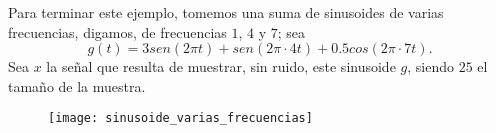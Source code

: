 \begin{ejemplo}
Para terminar este ejemplo, tomemos una suma de sinusoides
de varias frecuencias, digamos, de frecuencias
$1$, $4$ y $7$; sea
\[
g(t) = 3 sen(2 \pi t) + sen(2 \pi \cdot 4t) + 0.5 cos(2 \pi \cdot 7t).
\]
Sea $x$ la señal que resulta de muestrar, sin ruido, este sinusoide
$g$, siendo $25$ el tamaño de la muestra.
\begin{figure}[H]
	\centering
	\texttt{[image: sinusoide\_varias\_frecuencias]} 
\end{figure}	

\final
\end{ejemplo}

